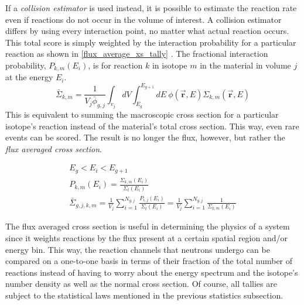 If a \emph{collision estimator} is used instead, it is possible to estimate the reaction rate even if reactions do not occur in the volume of interest.  A collision estimator differs by using every interaction point, no matter what actual reaction occurs.  This total score is simply weighted by the interaction probability for a particular reaction as shown in \eqref{flux_average_xs_tally} \cite{jaakko}.  The fractional interaction probability, $P_{k,m}(E_i)$, is for reaction $k$ in isotope $m$ in the material in volume $j$ at the energy $E_i$.
%
\begin{equation}
\label{flux_average_xs}
\bar{\Sigma}_{k,m} =  \frac{1}{V_j \bar{\phi}_{g,j} } \int_{v_j} dV \int_{E_g}^{E_{g+1}} dE \: \phi(\boldsymbol{\vec{r}},E) \Sigma_{k,m}(\boldsymbol{\vec{r}},E)
\end{equation} %
%
This is equivalent to summing the macroscopic cross section for a particular isotope's reaction instead of the material's total cross section.  This way, even rare events can be scored.  The result is no longer the flux, however, but rather the \emph{flux averaged cross section}.  

\begin{equation}
\label{flux_average_xs_tally}
\begin{gathered}
E_g < E_i < E_{g+1} \\
P_{k,m}(E_i)= \frac{\Sigma_{k,m}(E_i)}{\Sigma_t(E_i)} \\
\bar{\Sigma}_{g,j,k,m} =  \frac{1}{V_j} \sum_{i=1}^{N_{g,j}} \frac{P_{i,j}(E_i)}{\Sigma_t(E_i)} = \frac{1}{V_j} \sum_{i=1}^{N_{g,j}} \frac{1}{\Sigma_{k,m}(E_i)}
\end{gathered}
\end{equation}

The flux averaged cross section is useful in determining the physics of a system since it weights reactions by the flux present at a certain spatial region and/or energy bin.  This way, the reaction channels that neutrons undergo can be compared on a one-to-one basis in terms of their fraction of the total number of reactions instead of having to worry about the energy spectrum and the isotope's number density as well as the normal cross section.%
  Of course, all tallies are subject to the statistical laws mentioned in the previous statistics subsection. %


